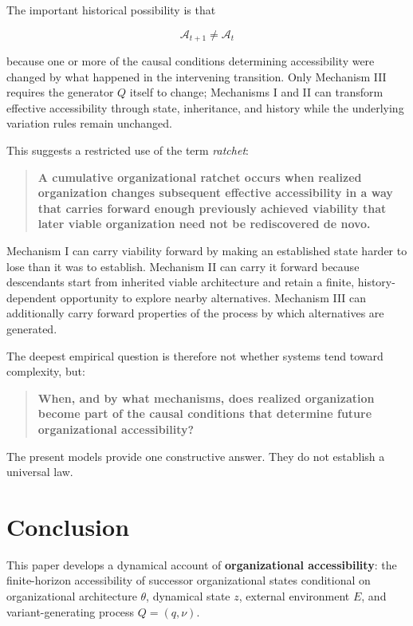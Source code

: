 \documentclass[11pt,a4paper]{article}
\begin{document}
The important historical possibility is that

\[
\mathcal A_{t+1}\neq\mathcal A_t
\]

because one or more of the causal conditions determining accessibility
were changed by what happened in the intervening transition. Only
Mechanism III requires the generator \(Q\) itself to change; Mechanisms
I and II can transform effective accessibility through state,
inheritance, and history while the underlying variation rules remain
unchanged.

This suggests a restricted use of the term \emph{ratchet}:

\begin{quote}
\textbf{A cumulative organizational ratchet occurs when realized
organization changes subsequent effective accessibility in a way that
carries forward enough previously achieved viability that later viable
organization need not be rediscovered de novo.}
\end{quote}

Mechanism I can carry viability forward by making an established state
harder to lose than it was to establish. Mechanism II can carry it
forward because descendants start from inherited viable architecture and
retain a finite, history-dependent opportunity to explore nearby
alternatives. Mechanism III can additionally carry forward properties of
the process by which alternatives are generated.

The deepest empirical question is therefore not whether systems tend
toward complexity, but:

\begin{quote}
\textbf{When, and by what mechanisms, does realized organization become
part of the causal conditions that determine future organizational
accessibility?}
\end{quote}

The present models provide one constructive answer. They do not
establish a universal law.

\section{Conclusion}\label{conclusion}

This paper develops a dynamical account of \textbf{organizational
accessibility}: the finite-horizon accessibility of successor
organizational states conditional on organizational architecture
\(\theta\), dynamical state \(z\), external environment \(E\), and
variant-generating process \(Q=(q,\nu)\).
\end{document}
